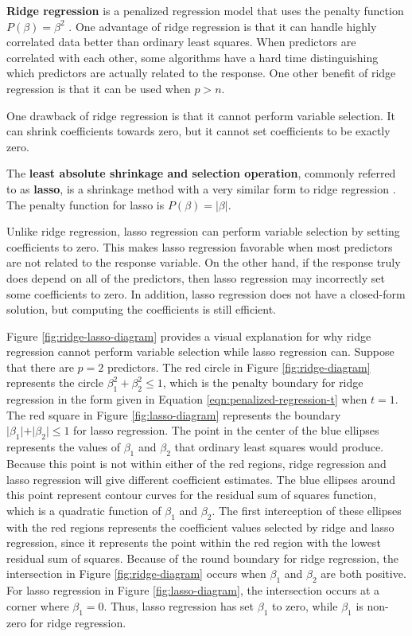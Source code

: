 \documentclass{article}
\begin{document}
\textbf{Ridge regression} is a penalized regression model that uses the penalty function $P(\beta) = \beta^2$ \cite{hoerl1970ridge}. One advantage of ridge regression is that it can handle highly correlated data better than ordinary least squares. When predictors are correlated with each other, some algorithms have a hard time distinguishing which predictors are actually related to the response. One other benefit of ridge regression is that it can be used when $p>n$.

One drawback of ridge regression is that it cannot perform variable selection. It can shrink coefficients towards zero, but it cannot set coefficients to be exactly zero.

The \textbf{least absolute shrinkage and selection operation}, commonly referred to as \textbf{lasso}, is a shrinkage method with a very similar form to ridge regression \cite{tibshirani1996regression, james2017islr, james2013introduction}. The penalty function for lasso is $P(\beta) = \vert \beta \vert$.

Unlike ridge regression, lasso regression can perform variable selection by setting coefficients to zero. This makes lasso regression favorable when most predictors are not related to the response variable. On the other hand, if the response truly does depend on all of the predictors, then lasso regression may incorrectly set some coefficients to zero. In addition, lasso regression does not have a closed-form solution, but computing the coefficients is still efficient.

Figure \ref{fig:ridge-lasso-diagram} provides a visual explanation for why ridge regression cannot perform variable selection while lasso regression can. Suppose that there are $p = 2$ predictors. The red circle in Figure \ref{fig:ridge-diagram} represents the circle $\beta_1^2 + \beta_2^2 \leq 1$, which is the penalty boundary for ridge regression in the form given in Equation \ref{eqn:penalized-regression-t} when $t = 1$. The red square in Figure \ref{fig:lasso-diagram} represents the boundary $\vert \beta_1 \vert + \vert \beta_2 \vert \leq 1$ for lasso regression. The point in the center of the blue ellipses represents the values of $\beta_1$ and $\beta_2$ that ordinary least squares would produce. Because this point is not within either of the red regions, ridge regression and lasso regression will give different coefficient estimates. The blue ellipses around this point represent contour curves for the residual sum of squares function, which is a quadratic function of $\beta_1$ and $\beta_2$. The first interception of these ellipses with the red regions represents the coefficient values selected by ridge and lasso regression, since it represents the point within the red region with the lowest residual sum of squares. Because of the round boundary for ridge regression, the intersection in Figure \ref{fig:ridge-diagram} occurs when $\beta_1$ and $\beta_2$ are both positive. For lasso regression in Figure \ref{fig:lasso-diagram}, the intersection occurs at a corner where $\beta_1=0$. Thus, lasso regression has set $\beta_1$ to zero, while $\beta_1$ is non-zero for ridge regression.
\end{document}
